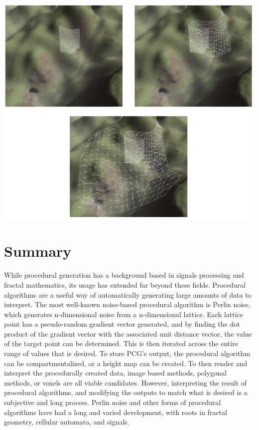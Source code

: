 \documentclass[10pt]{report}
\begin{document}
		\begin{minipage}{\textwidth}
			\centering
			\includegraphics[scale=.75]{voxel-detail}
			\label{fig:voxel-layered-mapping}
		\end{minipage}
			
	\vspace{10pt}
	\let\clearpage\relax
	\chapter{Summary}
		
		While procedural generation has a background based in signals processing and fractal mathematics, its usage has extended far beyond these fields. Procedural algorithms are a useful way of automatically generating large amounts of data to interpret. The most well-known noise-based procedural algorithm is Perlin noise, which generates n-dimensional noise from a n-dimensional lattice. Each lattice point has a pseudo-random gradient vector generated, and by finding the dot product of the gradient vector with the associated unit distance vector, the value of the target point can be determined. This is then iterated across the entire range of values that is desired. To store PCG's output, the procedural algorithm can be compartmentalized, or a height map can be created. To then render and interpret the procedurally created data, image based methods, polygonal methods, or voxels are all viable candidates. However, interpreting the result of procedural algorithms, and modifying the outputs to match what is desired is a subjective and long process. Perlin noise and other forms of procedural algorithms have had a long and varied development, with roots in fractal geometry, cellular automata, and signals. 
	
	\newpage
	\renewcommand{\bibname}{References}
	
		
\end{document}

